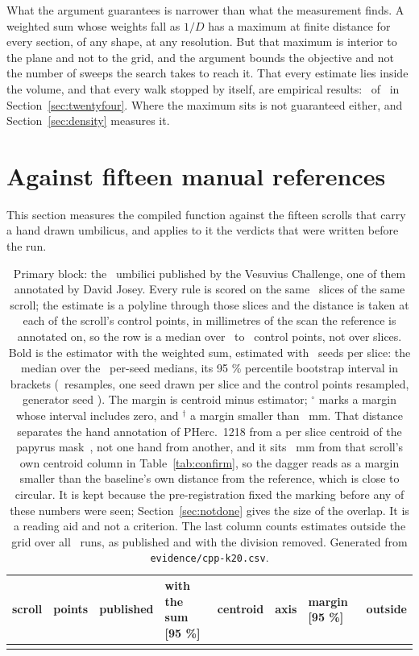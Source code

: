 What the argument guarantees is narrower than what the measurement finds. A weighted sum whose
weights fall as $1/D$ has a maximum at finite distance for every section, of any shape, at any
resolution. But that maximum is interior to the plane and not to the grid, and the argument bounds
the objective and not the number of sweeps the search takes to reach it. That every estimate lies
inside the volume, and that every walk stopped by itself, are empirical results:
\RevGenInsideFixed\ of \RevGenSlices\ in Section~\ref{sec:twentyfour}. Where the maximum sits is not
guaranteed either, and Section~\ref{sec:density} measures it.

\section{Against fifteen manual references}
\label{sec:fifteen}
This section measures the compiled function against the fifteen scrolls that carry a hand drawn
umbilicus, and applies to it the verdicts that were written before the run.

\begin{table}[t]
\caption{Primary block: the \UmbPrimaryScrolls\ umbilici published by the Vesuvius Challenge, one
of them annotated by David Josey. Every rule is scored on the same \RevFifteenSlices\ slices of the
same scroll; the estimate is a polyline through those slices and the distance is taken at each of
the scroll's control points, in millimetres of the scan the reference is annotated on, so the row
is a median over \RevFifteenCpMin\ to \RevFifteenCpMax\ control points, not over slices. Bold is
the estimator with the weighted sum, estimated with \RevKSeeds\ seeds per slice: the median over
the \RevKSeeds\ per-seed medians, its 95 \% percentile bootstrap interval in brackets
(\RevKResamples\ resamples, one seed drawn per slice and the control points resampled, generator
seed \RevKBootSeed). The margin is centroid minus estimator; $^{\circ}$ marks a margin whose
interval includes zero, and $^{\dagger}$ a margin smaller than \UmbReferenceSpread~mm. That
distance separates the hand annotation of PHerc.\ 1218 from a per slice centroid of the papyrus
mask~\cite{dopico}, not one hand from another, and it sits \SecRefPublishedVsCentroidMm~mm from
that scroll's own centroid column in Table~\ref{tab:confirm}, so the dagger reads as a margin
smaller than the baseline's own distance from the reference, which is close to circular. It is
kept because the pre-registration fixed the marking before any of these numbers were seen;
Section~\ref{sec:notdone} gives the size of the overlap. It is a reading aid and not a
criterion. The last column counts estimates outside the grid over all \RevKInsideOf\ runs, as
published and with the division removed. Generated from \texttt{evidence/cpp-k20.csv}.}
\label{tab:primary}
\centering
\footnotesize
\setlength{\tabcolsep}{3.5pt}
\begin{tabular}{@{}lrrlrrlc@{}}
\toprule
scroll & points & published & \textbf{with the sum} [95 \%] & centroid & axis & margin [95 \%] & outside \\
\midrule
{}{rev1-k20-primary}
\bottomrule
\end{tabular}
\end{table}

